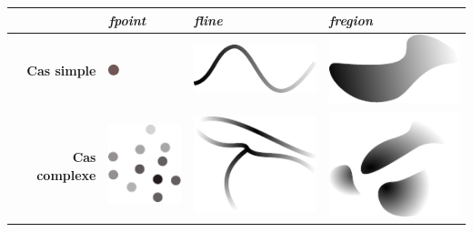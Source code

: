 \begin{tabular}{rC{3.5cm}C{3.5cm}C{3.5cm}}
  \toprule
  & \emph{fpoint} & \emph{fline} & \emph{fregion} \\
  \midrule
  \addlinespace[.5cm]
  \textbf{Cas simple} &\includegraphics{../figures/SchneiderP1.pdf} &
                                                                      \includegraphics{../figures/SchneiderP2.pdf}&\includegraphics{../figures/SchneiderP3.pdf}\\
  \addlinespace[.5cm]
  \textbf{Cas complexe} &\includegraphics{../figures/SchneiderP4.pdf} & \includegraphics{../figures/SchneiderP5.pdf}&\includegraphics{../figures/SchneiderP6.pdf}\\
  \bottomrule
\end{tabular}
